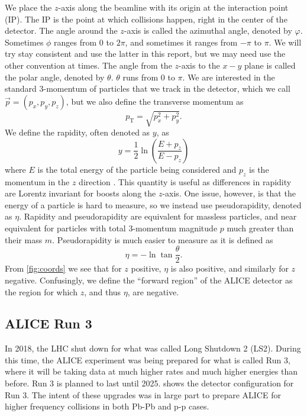 We place the $z$-axis along the beamline with its origin at the interaction point (IP). The IP is the point at which collisions happen, right in the center of the detector. The angle around the $z$-axis is called the azimuthal angle, denoted by $\varphi$. Sometimes $\phi$ ranges from 0 to $2\pi$, and sometimes it ranges from $-\pi$ to $\pi$. We will try stay consistent and use the latter in this report, but we may need use the other convention at times. The angle from the $z$-axis to the $x-y$ plane is called the polar angle, denoted by $\theta$. $\theta$ runs from 0 to $\pi$. We are interested in the standard 3-momentum of particles that we track in the detector, which we call $\vec{p}=(p_x,p_y,p_z)$, but we also define the transverse momentum as 
\begin{equation}
    p_{\mathrm{T}}=\sqrt{p_x^2 + p_y^2}.
    \label{eqn:transverse momentum}
\end{equation}
We define the rapidity, often denoted as $y$, as
\begin{equation}
    y=\frac 12 \ln\left(\frac{E+p_z}{E-p_z}\right)
    \label{eqn:rapidity}
\end{equation}
where $E$ is the total energy of the particle being considered and $p_z$ is the momentum in the $z$ direction \cite{kar_exp_phys}. This quantity is useful as differences in rapidity are Lorentz invariant for boosts along the $z$-axis. One issue, however, is that the energy of a particle is hard to measure, so we instead use pseudorapidity, denoted as $\eta$. Rapidity and pseudorapidity are equivalent for massless particles, and near equivalent for particles with total 3-momentum magnitude $p$ much greater than their mass $m$. Pseudorapidity is much easier to measure as it is defined as \cite{kar_exp_phys}
\begin{equation}
    \eta=-\ln\tan\frac{\theta}{2}.
    \label{eqn:pseudorapidity}
\end{equation}
From \cref{fig:coords} we see that for $z$ positive, $\eta$ is also positive, and similarly for $z$ negative. Confusingly, we define the ``forward region'' of the ALICE detector as the region for which $z$, and thus $\eta$, are negative. 

\subsection{ALICE Run 3}
In 2018, the LHC shut down for what was called Long Shutdown 2 (LS2). During this time, the ALICE experiment was being prepared for what is called Run 3, where it will be taking data at much higher rates and much higher energies than before. Run 3 is planned to last until 2025.  shows the detector configuration for Run 3. The intent of these upgrades was in large part to prepare ALICE for higher frequency collisions in both Pb-Pb and p-p cases. 

